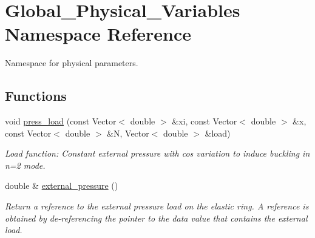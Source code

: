 \hypertarget{namespaceGlobal__Physical__Variables}{}\section{Global\+\_\+\+Physical\+\_\+\+Variables Namespace Reference}
\label{namespaceGlobal__Physical__Variables}


Namespace for physical parameters.  


\subsection*{Functions}
\begin{DoxyCompactItemize}
\item 
void \hyperlink{namespaceGlobal__Physical__Variables_a86fd8f502cb8c4c7939ffae742f023eb}{press\+\_\+load} (const Vector$<$ double $>$ \&xi, const Vector$<$ double $>$ \&x, const Vector$<$ double $>$ \&N, Vector$<$ double $>$ \&load)
\begin{DoxyCompactList}\small\item\em Load function\+: Constant external pressure with cos variation to induce buckling in n=2 mode. \end{DoxyCompactList}\item 
double \& \hyperlink{namespaceGlobal__Physical__Variables_a8c25ac6a672ea50d1b709292d1f4837b}{external\+\_\+pressure} ()
\begin{DoxyCompactList}\small\item\em Return a reference to the external pressure load on the elastic ring. A reference is obtained by de-\/referencing the pointer to the data value that contains the external load. \end{DoxyCompactList}\end{DoxyCompactItemize}
